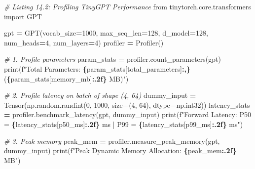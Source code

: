 \documentclass[
  letterpaper,
]{scrbook}
\newenvironment{Shaded}{\begin{snugshade}}{\end{snugshade}}
\newcommand{\BuiltInTok}[1]{#1}
\newcommand{\CommentTok}[1]{\textcolor[rgb]{0.56,0.35,0.01}{\textit{#1}}}
\newcommand{\DecValTok}[1]{\textcolor[rgb]{0.00,0.00,0.81}{#1}}
\newcommand{\ImportTok}[1]{#1}
\newcommand{\NormalTok}[1]{#1}
\newcommand{\OperatorTok}[1]{\textcolor[rgb]{0.81,0.36,0.00}{\textbf{#1}}}
\newcommand{\SpecialCharTok}[1]{\textcolor[rgb]{0.81,0.36,0.00}{\textbf{#1}}}
\newcommand{\SpecialStringTok}[1]{\textcolor[rgb]{0.31,0.60,0.02}{#1}}
\newcommand{\StringTok}[1]{\textcolor[rgb]{0.31,0.60,0.02}{#1}}
\begin{document}
\begin{Shaded}
\begin{Highlighting}[]
\CommentTok{\# Listing 14.2: Profiling TinyGPT Performance}
\ImportTok{from}\NormalTok{ tinytorch.core.transformers }\ImportTok{import}\NormalTok{ GPT}

\NormalTok{gpt }\OperatorTok{=}\NormalTok{ GPT(vocab\_size}\OperatorTok{=}\DecValTok{1000}\NormalTok{, max\_seq\_len}\OperatorTok{=}\DecValTok{128}\NormalTok{, d\_model}\OperatorTok{=}\DecValTok{128}\NormalTok{, num\_heads}\OperatorTok{=}\DecValTok{4}\NormalTok{, num\_layers}\OperatorTok{=}\DecValTok{4}\NormalTok{)}
\NormalTok{profiler }\OperatorTok{=}\NormalTok{ Profiler()}

\CommentTok{\# 1. Profile parameters}
\NormalTok{param\_stats }\OperatorTok{=}\NormalTok{ profiler.count\_parameters(gpt)}
\BuiltInTok{print}\NormalTok{(}\SpecialStringTok{f"Total Parameters: }\SpecialCharTok{\{}\NormalTok{param\_stats[}\StringTok{\textquotesingle{}total\_parameters\textquotesingle{}}\NormalTok{]}\SpecialCharTok{:,\}}\SpecialStringTok{ (}\SpecialCharTok{\{}\NormalTok{param\_stats[}\StringTok{\textquotesingle{}memory\_mb\textquotesingle{}}\NormalTok{]}\SpecialCharTok{:.2f\}}\SpecialStringTok{ MB)"}\NormalTok{)}

\CommentTok{\# 2. Profile latency on batch of shape (4, 64)}
\NormalTok{dummy\_input }\OperatorTok{=}\NormalTok{ Tensor(np.random.randint(}\DecValTok{0}\NormalTok{, }\DecValTok{1000}\NormalTok{, size}\OperatorTok{=}\NormalTok{(}\DecValTok{4}\NormalTok{, }\DecValTok{64}\NormalTok{), dtype}\OperatorTok{=}\NormalTok{np.int32))}
\NormalTok{latency\_stats }\OperatorTok{=}\NormalTok{ profiler.benchmark\_latency(gpt, dummy\_input)}
\BuiltInTok{print}\NormalTok{(}\SpecialStringTok{f"Forward Latency: P50 = }\SpecialCharTok{\{}\NormalTok{latency\_stats[}\StringTok{\textquotesingle{}p50\_ms\textquotesingle{}}\NormalTok{]}\SpecialCharTok{:.2f\}}\SpecialStringTok{ ms | P99 = }\SpecialCharTok{\{}\NormalTok{latency\_stats[}\StringTok{\textquotesingle{}p99\_ms\textquotesingle{}}\NormalTok{]}\SpecialCharTok{:.2f\}}\SpecialStringTok{ ms"}\NormalTok{)}

\CommentTok{\# 3. Peak memory}
\NormalTok{peak\_mem }\OperatorTok{=}\NormalTok{ profiler.measure\_peak\_memory(gpt, dummy\_input)}
\BuiltInTok{print}\NormalTok{(}\SpecialStringTok{f"Peak Dynamic Memory Allocation: }\SpecialCharTok{\{}\NormalTok{peak\_mem}\SpecialCharTok{:.2f\}}\SpecialStringTok{ MB"}\NormalTok{)}
\end{Highlighting}
\end{Shaded}
\end{document}
